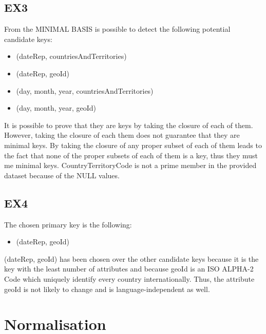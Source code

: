 \documentclass{article}
\begin{document}
\subsection{EX3}
 From the MINIMAL BASIS is possible to detect the following potential candidate keys:
 \begin{multicols}{2}
\begin{itemize}
    \item (dateRep, countriesAndTerritories)
    \item (dateRep, geoId)
    \item (day, month, year, countriesAndTerritories)
    \item (day, month, year, geoId)
\end{itemize}
\end{multicols}
It is possible to prove that they are keys by taking the closure of each of them. However, taking the closure of each them does not guarantee that they are minimal keys. By taking the closure of any proper subset of each of them leads to the fact that none of the proper subsets of each of them is a key, thus they must me minimal keys. CountryTerritoryCode is not a prime member in the provided dataset because of the NULL values.
\subsection{EX4}
 The chosen primary key is the following:
\begin{itemize}
    \item (dateRep, geoId)
\end{itemize}
(dateRep, geoId) has been chosen over the other candidate keys because it is the key with the least number of attributes and because geoId is an ISO ALPHA-2 Code which uniquely identify every country internationally. Thus, the attribute geoId is not likely to change and is language-independent as well.
\section{Normalisation}
\end{document}
